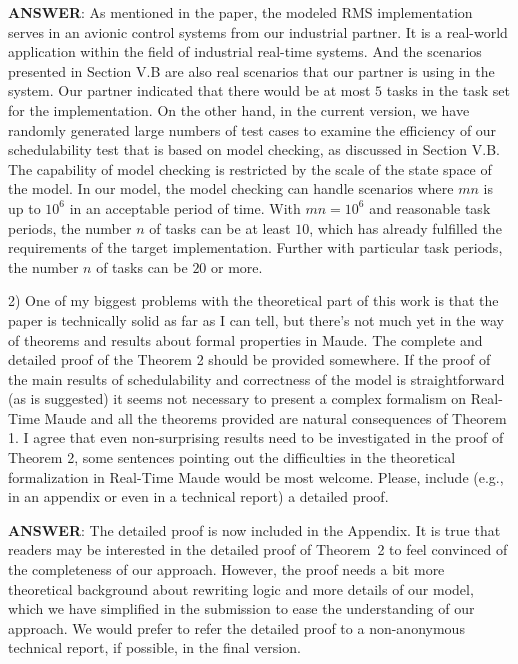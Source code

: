 \documentclass[10pt,journal]{IEEEtran}
\newcommand{\ANSWER}{{\bf ANSWER}}
\begin{document}
\ANSWER: As mentioned in the paper, the modeled RMS implementation
serves in an avionic control systems from our industrial partner. It
is a real-world application within the field of industrial real-time
systems. And the scenarios presented in Section V.B are also real
scenarios that our partner is using in the system. Our partner
indicated that there would be at most $5$ tasks in the task set for
the implementation. On the other hand, in the current version, we have
randomly generated large numbers of test cases to examine the
efficiency of our schedulability test that is based on model checking,
as discussed in Section V.B. The capability of model checking is
restricted by the scale of the state space of the model. In our model,
the model checking can handle scenarios where $mn$ is up to $10^6$ in
an acceptable period of time. With $mn=10^6$ and reasonable task
periods, the number $n$ of tasks can be at least $10$, which has
already fulfilled the requirements of the target
implementation. Further with particular task periods, the number $n$
of tasks can be $20$ or more.


2) One of my biggest problems with the theoretical part of this work
is that the paper is technically solid as far as I can tell, but
there's not much yet in the way of theorems and results about formal
properties in Maude. The complete and detailed proof of the Theorem 2
should be provided somewhere. If the proof of the main results of
schedulability and correctness of the model is straightforward (as is
suggested) it seems not necessary to present a complex formalism on
Real-Time Maude and all the theorems provided are natural consequences
of Theorem 1. I agree that even non-surprising results need to be
investigated in the proof of Theorem 2, some sentences pointing out
the difficulties in the theoretical formalization in Real-Time Maude
would be most welcome. Please, include (e.g., in an appendix or even
in a technical report) a detailed proof.

\ANSWER: The detailed proof is now included in the Appendix. It is true
that readers may be interested in the detailed proof of Theorem~2 to
feel convinced of the completeness of our approach. However, the proof
needs a bit more theoretical background about rewriting logic and more
details of our model, which we have simplified in the submission to
ease the understanding of our approach. We would prefer to refer the
detailed proof to a non-anonymous technical report, if possible, in
the final version.
\end{document}

